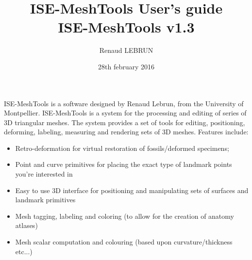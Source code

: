 \documentclass[12pt, a4paper]{book}
\title{ISE-MeshTools User's guide\\ISE-MeshTools v1.3}
\author{Renaud LEBRUN}
\date{28th february 2016}
\begin{document}
	\dominitoc

	\maketitle
   ISE-MeshTools is a software designed by Renaud Lebrun, from the University of Montpellier. ISE-MeshTools is a 
system for the processing and editing of series of 3D triangular meshes. The system provides a set of tools for editing, 
positioning, deforming, labeling, measuring and rendering sets of 3D meshes. Features include:
\begin{itemize}
\item Retro-deformation for virtual restoration of fossils/deformed specimens;
\item Point and curve primitives for placing the exact type of landmark points you’re interested in
\item Easy to use 3D interface for positioning and manipulating sets of surfaces and landmark primitives
\item Mesh tagging, labeling and coloring (to allow for the creation of anatomy atlases)
\item Mesh scalar computation and colouring (based upon curvature/thickness etc...)
\end{itemize}


\tableofcontents


		 
		 
     
	   
		
		
\end{document}
